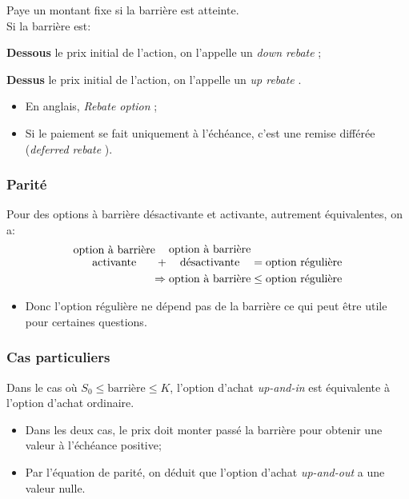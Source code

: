 \documentclass[10pt, french]{article}
\begin{document}
\begin{multicols*}{2}
\begin{definitionNOHFILLsub}
Paye un montant fixe si la barrière est atteinte.\\

Si la barrière est:
\begin{description}
	\item	\textbf{Dessous} le prix initial de l'action, on l'appelle un \og \textit{down rebate} \fg{};
	\item	\textbf{Dessus} le prix initial de l'action, on l'appelle un \og \textit{up rebate} \fg{}.
\end{description}

\tcbline

\begin{itemize}[leftmargin = *]
	\item	En anglais, \og \textit{Rebate option} \fg{};
	\item	Si le paiement se fait uniquement à l'échéance, c'est une remise différée (\og \textit{deferred rebate} \fg{}).
\end{itemize}
\end{definitionNOHFILLsub}

\subsubsection*{Parité}
Pour des options à barrière désactivante et activante, autrement équivalentes, on a:
\begin{align*}
	\shortstack{option à barrière\\ activante}	+ \shortstack{option à barrière\\ désactivante}
	&=	\shortstack{option régulière}	\\
	\Rightarrow
	\shortstack{option à barrière}	
	&\leq	\shortstack{option régulière}	
\end{align*} 
\begin{itemize}[leftmargin = *]
	\item	Donc l'option régulière ne dépend pas de la barrière ce qui peut être utile pour certaines questions.
\end{itemize}

\subsubsection*{Cas particuliers}

Dans le cas où $S_{0} \leq \text{barrière} \leq K$, l'option d'achat \og \textit{up-and-in} \fg{} est équivalente à l'option d'achat ordinaire. 
\begin{itemize}[leftmargin = *]
	\item	Dans les deux cas, le prix doit monter passé la barrière pour obtenir une valeur à l'échéance positive;
	\item	Par l'équation de parité, on déduit que l'option d'achat \og \textit{up-and-out} \fg{} a une valeur nulle.
\end{itemize}


\end{multicols*}
\end{document}
